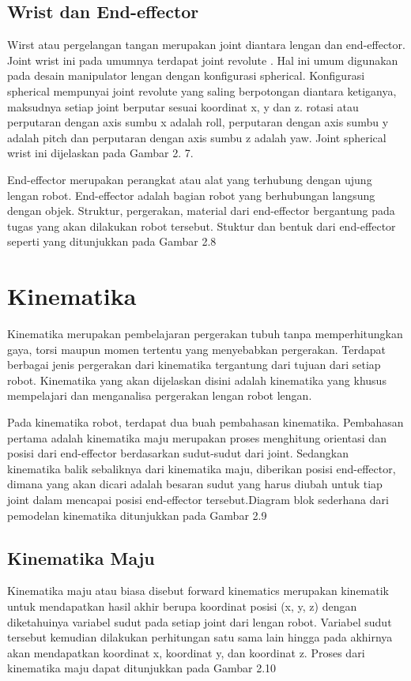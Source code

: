 \subsection{ Wrist dan End-effector }

Wirst atau pergelangan tangan merupakan joint diantara lengan dan end-effector. Joint wrist ini pada umumnya terdapat joint revolute . Hal ini umum digunakan pada desain manipulator lengan dengan konfigurasi spherical. Konfigurasi spherical mempunyai joint revolute yang saling berpotongan diantara ketiganya, maksudnya setiap joint berputar sesuai koordinat x, y dan z. rotasi atau perputaran dengan axis sumbu x adalah roll, perputaran dengan axis sumbu y adalah pitch dan perputaran dengan axis sumbu z adalah yaw. Joint spherical wrist ini dijelaskan pada Gambar 2. 7.


End-effector merupakan perangkat atau alat yang terhubung dengan ujung lengan robot. End-effector adalah bagian robot yang berhubungan langsung dengan objek. Struktur, pergerakan, material dari end-effector bergantung pada tugas yang akan dilakukan robot tersebut. Stuktur dan bentuk dari end-effector seperti yang ditunjukkan pada Gambar 2.8

\section{Kinematika}
Kinematika merupakan pembelajaran pergerakan tubuh tanpa memperhitungkan gaya, torsi maupun momen tertentu yang menyebabkan pergerakan. Terdapat berbagai jenis pergerakan dari kinematika tergantung dari tujuan dari setiap robot. Kinematika yang akan dijelaskan disini adalah kinematika yang khusus mempelajari dan menganalisa pergerakan lengan robot lengan.  

Pada kinematika robot, terdapat dua buah pembahasan kinematika. Pembahasan pertama adalah kinematika maju merupakan proses menghitung orientasi dan posisi dari end-effector berdasarkan sudut-sudut dari joint.  Sedangkan kinematika balik sebaliknya dari kinematika maju, diberikan posisi end-effector, dimana yang akan dicari adalah besaran sudut yang harus diubah untuk tiap joint dalam mencapai posisi end-effector tersebut.Diagram blok sederhana dari pemodelan kinematika ditunjukkan pada Gambar 2.9

\subsection{Kinematika Maju}
Kinematika maju atau biasa disebut forward kinematics merupakan kinematik untuk mendapatkan hasil akhir berupa koordinat posisi (x, y, z) dengan diketahuinya variabel sudut pada setiap joint dari lengan robot.  Variabel sudut tersebut kemudian dilakukan perhitungan satu sama lain hingga pada akhirnya akan mendapatkan koordinat x, koordinat y, dan koordinat z. Proses dari kinematika maju dapat ditunjukkan pada Gambar 2.10

